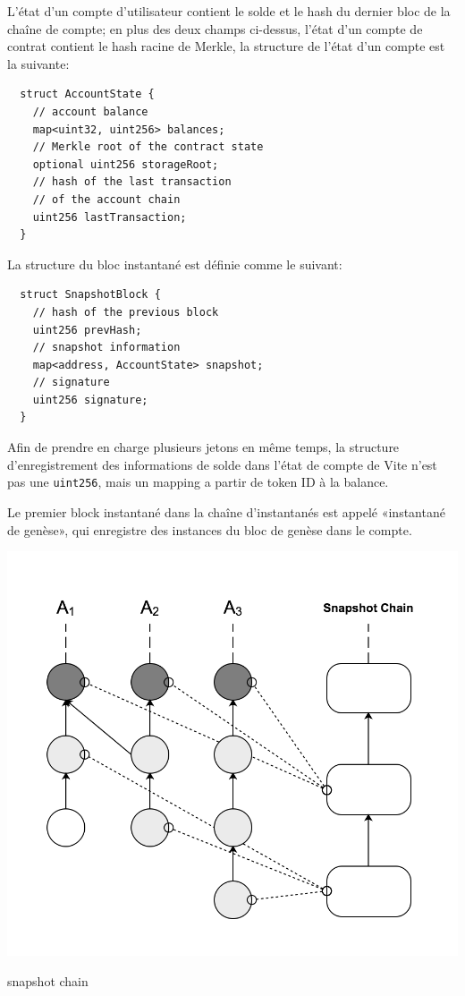 \documentclass[UTF8,nofonts]{article}
\makeatletter
\newenvironment{figurehere}
 {\def\@captype{figure}}
 {}
\makeatother
\begin{document}
\begin{multicols}{2}
L'état d'un compte d'utilisateur contient le solde et le hash du dernier bloc de la chaîne de compte; en plus des deux champs ci-dessus, l'état d'un compte de contrat contient le hash racine de Merkle, la structure de l'état d'un compte est la suivante:

\begin{verbatim}
  struct AccountState {
    // account balance
    map<uint32, uint256> balances;
    // Merkle root of the contract state
    optional uint256 storageRoot;
    // hash of the last transaction
    // of the account chain
    uint256 lastTransaction;
  }
\end{verbatim}

La structure du bloc instantané est définie comme le suivant:
\begin{verbatim}
  struct SnapshotBlock {
    // hash of the previous block   
    uint256 prevHash;
    // snapshot information
    map<address, AccountState> snapshot;
    // signature
    uint256 signature;
  }
\end{verbatim}

Afin de prendre en charge plusieurs jetons en même temps, la structure d'enregistrement des informations de solde dans l'état de compte de Vite n'est pas une \texttt{uint256}, mais un mapping a partir de token ID à la balance.

Le premier block instantané dans la chaîne d'instantanés est appelé «instantané de genèse», qui enregistre des instances du bloc de genèse dans le compte.

\begin{center}
\begin{figurehere}
\includegraphics[width=.7\linewidth]{image/snapshotchain.png}
\caption{snapshot chain}
\end{figurehere}
\end{center}


\end{multicols}
\end{document}
